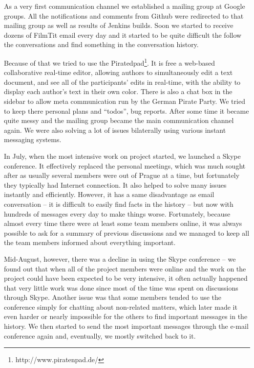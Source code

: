 {As a very first communication channel we established a mailing group at Google groups. All the notifications and comments from Github were redirected to that mailing group as well as results of Jenkins builds. Soon we started to receive dozens of FilmTit email every day and it started to be quite difficult the follow the conversations and find something in the conversation history.

Because of that we tried to use the Piratedpad\footnote{http://www.piratenpad.de/}. It is free a web-based collaborative real-time editor, allowing authors to simultaneously edit a text document, and see all of the participants' edits in real-time, with the ability to display each author's text in their own color. There is also a chat box in the sidebar to allow meta communication run by the German Pirate Party. We tried to keep there personal plans and ``todos'', bug reports. After some time it became quite messy and the mailing group became the main communication channel again. We were also solving a lot of issues bilaterally using various instant messaging systems.

In July, when the most intensive work on project started, we launched a Skype conference. It effectively replaced the personal meetings, which was much sought after as usually several members were out of Prague at a time, but fortunately they typically had Internet connection.
It also helped to solve many issues instantly and efficiently.
However, it has a same disadvantage as email conversation -- it is difficult to easily find facts in the history -- but now with hundreds of messages every day to make things worse.
Fortunately, because almost every time there were at least some team members online, it was always possible to ask for a summary of previous discussions and we managed to keep all the team members informed about everything important.

Mid-August, however, there was a decline in using the Skype conference -- we found out that when all of the project members were online and the work on the project could have been expected to be very intensive, it often actually happened that very little work was done since most of the time was spent on discussions through Skype.
Another issue was that some members tended to use the conference simply for chatting about non-related matters, %
which later made it even harder or nearly impossible for the others to find important messages in the history.
We then started to send the most important messages through the e-mail conference again and, eventually, we mostly switched back to it.


}
